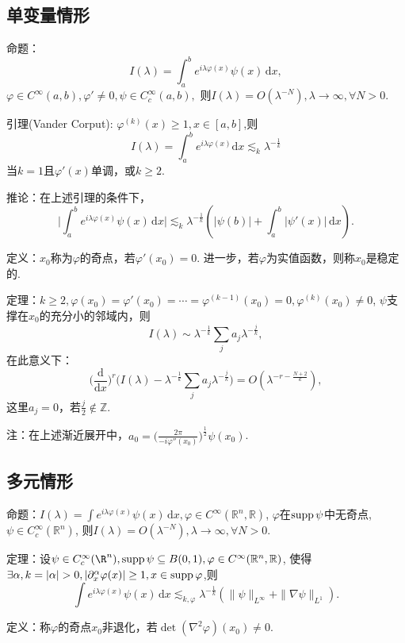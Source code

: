 \subsection{单变量情形}

命题：$$I(\lambda)=\int _a^b e^{i\lambda \varphi(x)}\psi(x)\,\mathrm{d}x,$$
$\varphi \in C^\infty(a,b), \varphi'\neq 0, \psi \in C_c^\infty(a,b),$
则$I(\lambda)=O(\lambda^{-N}),\lambda\to \infty,\forall N>0$.

引理(Vander Corput): $\varphi ^{(k)}(x)\geq 1, x\in [a,b]$,则
$$I(\lambda)=\int_a^b e^{i\lambda \varphi(x)}\mathrm{d}x
\lesssim _k \lambda^{-\frac{1}{k}}$$
当$k=1$且$\varphi'(x)$单调，或$k\geq 2$.

推论：在上述引理的条件下，
$$\bigg| \int _a^b e^{i\lambda \varphi(x)}\psi (x)\,\mathrm{d}x\bigg| 
\lesssim _k \lambda^{-\frac{1}{k}}
(|\psi(b)| +\int _a^b |\psi'(x)| \,\mathrm{d}x).$$

定义：$x_0$称为$\varphi$的奇点，若$\varphi'(x_0)=0$. 
进一步，若$\varphi$为实值函数，则称$x_0$是稳定的.

定理：$k\geq 2,\varphi(x_0)=\varphi'(x_0)=\cdots =\varphi^{(k-1)}(x_0)=0,\varphi^{(k)}(x_0)\neq 0$,
$\psi$支撑在$x_0$的充分小的邻域内，则
$$I(\lambda)\sim \lambda^{-\frac{1}{k}}\sum_{j}a_j \lambda^{-\frac{j}{k}},$$
在此意义下：
$$\Big(\frac{\mathrm{d}}{\mathrm{d}x}\Big)^r
\Big(I(\lambda)-\lambda^{-\frac{1}{k}}\sum_{j}a_j \lambda^{-\frac{j}{k}}\Big)
=O(\lambda^{-r-\frac{N+2}{k}}),$$
这里$a_j=0$，若$\frac{j}{2}\notin \mathbb{Z}$.

注：在上述渐近展开中，$a_0=\big(\frac{2\pi}{-i\varphi''(x_0)}\big)^{\frac{1}{2}}\psi(x_0)$.

\subsection{多元情形}

命题：$I(\lambda)=\int e^{i\lambda \varphi(x)}\psi(x)\,\mathrm{d}x,
\varphi \in C^\infty(\mathbb{R}^n,\mathbb{R})$, 
$\varphi$在$\operatorname{supp} \psi$中无奇点, $\psi \in C_c^\infty(\mathbb{R}^n)$,
则$I(\lambda)=O(\lambda^{-N}),\lambda\to \infty,\forall N>0$.


定理：设$\psi\in C_c^\infty(\R^n),\supp\psi \subseteq B(0,1),
\varphi\in C^\infty(\mathbb{R}^n,\mathbb{R})$,
使得$\exists \alpha, k=|\alpha|>0,
|\partial^\alpha_x \varphi(x)| \geq 1, x\in \supp\varphi$,则
$$\int e^{i\lambda \varphi(x)}\psi(x)\,\mathrm{d}x \lesssim_{k,\varphi}
\lambda^{-\frac{1}{k}}(\|\psi\|_{L^\infty}+\|\nabla\psi\|_{L^1}).$$

定义：称$\varphi$的奇点$x_0$非退化，若$\det(\nabla ^2\varphi)(x_0)\neq 0.$

